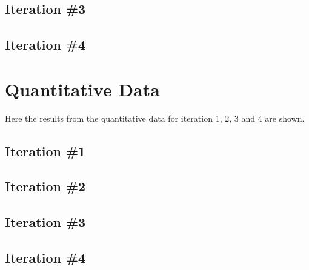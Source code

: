 
\subsection{Iteration \#3}


\subsection{Iteration \#4}


\section{Quantitative Data}

Here the results from the quantitative data for iteration 1, 2, 3 and 4 are shown.

\subsection{Iteration \#1}


\subsection{Iteration \#2}


\subsection{Iteration \#3}


\subsection{Iteration \#4}





%

